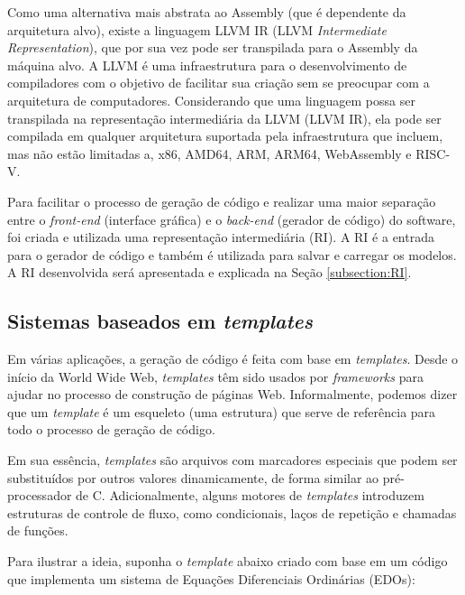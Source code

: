 \documentclass[
	12pt,				%
	openright,			%
	oneside,			%
	a4paper,			%
	main=brazil,
	english,			%
	]{ufsj-abntex2}
\begin{document}

Como uma alternativa mais abstrata ao Assembly (que é dependente da arquitetura alvo), existe a linguagem LLVM IR (LLVM \textit{Intermediate Representation}), que por sua vez pode ser transpilada para o Assembly da máquina alvo. A LLVM é uma infraestrutura para o desenvolvimento de compiladores com o objetivo de facilitar sua criação sem se preocupar com a arquitetura de computadores. Considerando que uma linguagem possa ser transpilada na representação intermediária da LLVM (LLVM IR), ela pode ser compilada em qualquer arquitetura suportada pela infraestrutura que incluem, mas não estão limitadas a, x86, AMD64, ARM, ARM64, WebAssembly e RISC-V.

Para facilitar o processo de geração de código e realizar uma maior separação entre o \textit{front-end} (interface gráfica) e o \textit{back-end} (gerador de código) do software, foi criada e utilizada uma representação intermediária (RI). A RI é a entrada para o gerador de código e também é utilizada para salvar e carregar os modelos. A RI desenvolvida será apresentada e explicada na Seção \ref{subsection:RI}.

\subsection{Sistemas baseados em \textit{templates}}
 
Em várias aplicações, a geração de código é feita com base em \textit{templates}. Desde o início da World Wide Web, \textit{templates} têm sido usados por \textit{frameworks} para ajudar no processo de construção de páginas Web. Informalmente, podemos dizer que um \textit{template} é um esqueleto (uma estrutura) que serve de referência para todo o processo de geração de código.

Em sua essência, \textit{templates} são arquivos com marcadores especiais que podem ser substituídos por outros valores dinamicamente, de forma similar ao pré-processador de C. Adicionalmente, alguns motores de \textit{templates} introduzem estruturas de controle de fluxo, como condicionais, laços de repetição e chamadas de funções. 

Para ilustrar a ideia, suponha o \textit{template} abaixo criado com base em um código que implementa um sistema de Equações Diferenciais Ordinárias (EDOs):  
\end{document}
